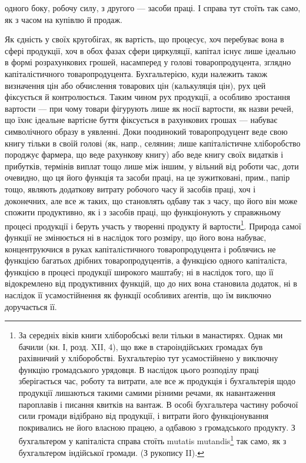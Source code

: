 \parcont{}  %
одного боку, робочу силу, з другого — засоби праці. І справа тут стоїть
так само, як з часом на купівлю й продаж.

Як єдність у своїх кругобігах, як вартість, що процесує, хоч перебуває
вона в сфері продукції, хоч в обох фазах сфери циркуляції, капітал
існує лише ідеально в формі розрахункових грошей, насамперед у голові
товаропродуцента, зглядно капіталістичного товаропродуцента. Бухгальтерією,
куди належить також визначення цін або обчислення товарових
цін (калькуляція цін), рух цей фіксується й контролюється. Таким
чином рух продукції, а особливо зростання вартости — при чому товари
фігурують лише як носії вартости, як назви речей, що їхнє ідеальне
вартісне буття фіксується в рахункових грошах — набуває символічного
образу в уявленні. Доки поодинокий товаропродуцент веде свою книгу
тільки в своїй голові (як, напр., селянин; лише капіталістичне хліборобство
породжує фармера, що веде рахункову книгу) або веде книгу своїх
видатків і прибутків, термінів виплат тощо лише між іншим, у вільний від
роботи час, доти очевидно, що ця його функція та засоби праці, на це
зужитковані, прим., папір тощо, являють додаткову витрату робочого часу
й засобів праці, хоч і доконечних, але все ж таких, що становлять одбаву
так з часу, що його він може спожити продуктивно, як і з засобів праці, що
функціонують у справжньому процесі продукції і беруть участь у творенні
продукту й вартости\footnote{
За середніх віків книги хліборобські вели тільки в манастирях. Однак ми
бачили (кн. І, розд. XII, 4), що вже в староіндійських громадах був рахівничий
у хліборобстві. Бухгальтерію тут усамостійнено у виключну функцію громадського урядовця. В наслідок
цього розподілу праці зберігається час, роботу та витрати, але все ж продукція і бухгальтерія щодо
продукції лишаються такими самими різними речами, як навантаження пароплавів і писання квитків на
вантаж. В особі бухгальтера частину робочої сили громади відібрано від продукції, і витрати його
функціонування покривались не його власною працею, а одбавою з громадськоґо
продукту. З бухгальтером у капіталіста справа стоїть mutatis mutandis\footnote*{
Змінивши те, що треба змінити, або з відповідними змінами. Ред.
} так само, як з бухгальтером
індійської громади. (З рукопису II).
}. Природа самої функції не змінюється ні в наслідок
того розміру, що його вона набуває, концентруючися в руках капіталістичного
товаропродуцента і роблячись не функцією багатьох дрібних товаропродуцентів,
а функцією одного капіталіста, функцією в процесі продукції
широкого маштабу; ні в наслідок того, що її відокремлено від продуктивних
функцій, що до них вона становила додаток, ні в наслідок її усамостійнення
як функції особливих аґентів, що їм виключно доручається її.


